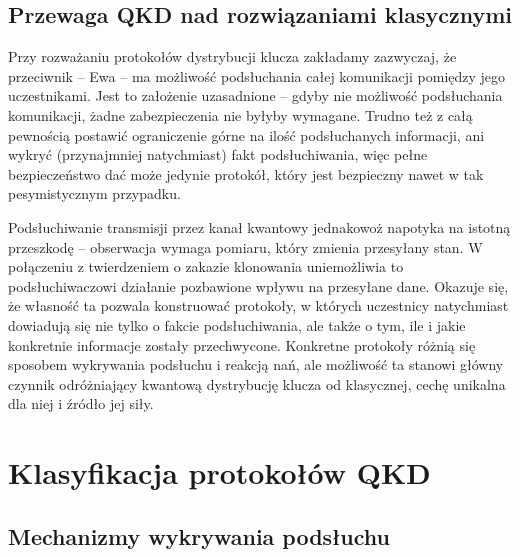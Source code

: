 \documentclass[10pt]{article}
\begin{document}

\subsection{Przewaga QKD nad rozwiązaniami klasycznymi}

Przy rozważaniu protokołów dystrybucji klucza zakładamy zazwyczaj, że przeciwnik -- Ewa -- ma możliwość
podsłuchania całej komunikacji pomiędzy jego uczestnikami. Jest to założenie uzasadnione -- gdyby nie
możliwość podsłuchania komunikacji, żadne zabezpieczenia nie byłyby wymagane. Trudno też z całą 
pewnością postawić ograniczenie górne na ilość podsłuchanych informacji, ani wykryć (przynajmniej
natychmiast) fakt podsłuchiwania, więc pełne bezpieczeństwo dać może jedynie protokół, który jest 
bezpieczny nawet w tak pesymistycznym przypadku. 

Podsłuchiwanie transmisji przez kanał kwantowy jednakowoż napotyka na istotną przeszkodę -- obserwacja
wymaga pomiaru, który zmienia przesyłany stan. W połączeniu z twierdzeniem o zakazie klonowania 
uniemożliwia to podsłuchiwaczowi działanie pozbawione wpływu na przesyłane dane. Okazuje się, że własność
ta pozwala konstruować protokoły, w których uczestnicy natychmiast dowiadują się nie tylko o fakcie
podsłuchiwania, ale także o tym, ile i jakie konkretnie informacje zostały przechwycone. Konkretne 
protokoły różnią się sposobem wykrywania podsłuchu i reakcją nań, ale możliwość ta stanowi główny 
czynnik odróżniający kwantową dystrybucję klucza od klasycznej, cechę unikalna dla niej i źródło jej 
siły.

\section{Klasyfikacja protokołów QKD}

\subsection{Mechanizmy wykrywania podsłuchu}
\end{document}
